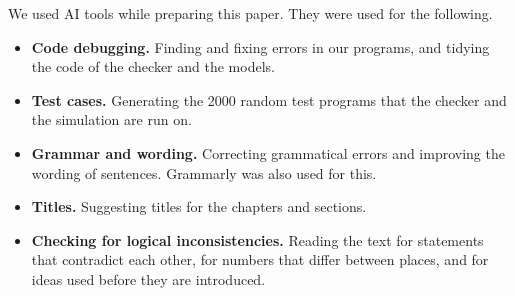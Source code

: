 We used AI tools while preparing this paper. They were used for the following.
\begin{itemize}
\item \textbf{Code debugging.} Finding and fixing errors in our programs, and tidying the code of the checker and the models.
\item \textbf{Test cases.} Generating the 2000 random test programs that the checker and the simulation are run on.
\item \textbf{Grammar and wording.} Correcting grammatical errors and improving the wording of sentences. Grammarly was also used for this.
\item \textbf{Titles.} Suggesting titles for the chapters and sections.
\item \textbf{Checking for logical inconsistencies.} Reading the text for statements that contradict each other, for numbers that differ between places, and for ideas used before they are introduced.
\end{itemize}

